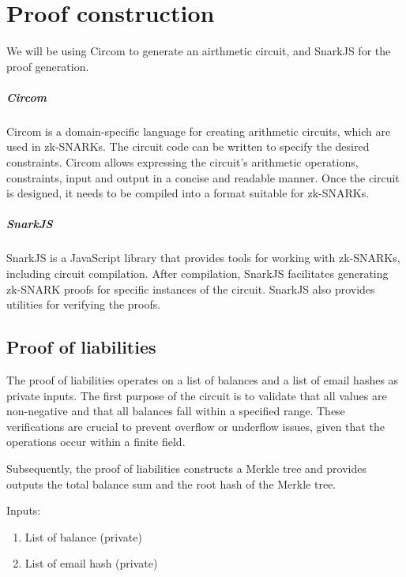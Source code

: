 
\chapter{Proof construction}
We will be using Circom to generate an airthmetic circuit, and SnarkJS for the proof generation.

\paragraph{Circom}
Circom is a domain-specific language for creating arithmetic circuits, which are used in zk-SNARKs.
The circuit code can be written to specify the desired constraints.
Circom allows expressing the circuit's arithmetic operations, constraints, input and output in a concise and readable manner.
Once the circuit is designed, it needs to be compiled into a format suitable for zk-SNARKs.


\paragraph{SnarkJS}
SnarkJS is a JavaScript library that provides tools for working with zk-SNARKs, including circuit compilation.
After compilation, SnarkJS facilitates generating zk-SNARK proofs for specific instances of the circuit.
SnarkJS also provides utilities for verifying the proofs.

\section{Proof of liabilities}
The proof of liabilities operates on a list of balances and a list of email hashes as private inputs.
The first purpose of the circuit is to validate that all values are non-negative and that all balances fall within a specified range. 
These verifications are crucial to prevent overflow or underflow issues, given that the operations occur within a finite field. 

Subsequently, the proof of liabilities constructs a Merkle tree and provides outputs the total balance sum and the root hash of the Merkle tree.

Inputs:
\begin{enumerate}

    \item List of balance (private)
    
    \item List of email hash (private)
    
    \end{enumerate}

